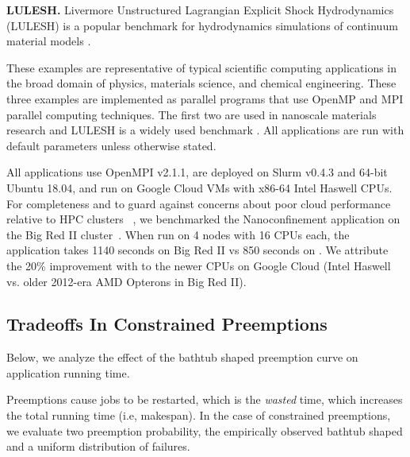 \noindent \textbf{LULESH.} Livermore Unstructured Lagrangian Explicit Shock Hydrodynamics (LULESH)  is a popular benchmark for hydrodynamics simulations of continuum material models \cite{IPDPS13:LULESH,LULESH2:changes}. 

These examples are representative of typical scientific computing applications in the broad domain of physics, materials science, and chemical engineering. These three examples are implemented as parallel programs that use OpenMP and MPI parallel computing techniques. The first two are used in nanoscale materials research \cite{jso1,jso2,solis2013generating,jjzo1,jto1,jyto} and LULESH is a widely used benchmark \cite{IPDPS13:LULESH,LULESH2:changes}.
All applications are run with default parameters unless otherwise stated. 


All applications use OpenMPI v2.1.1, are deployed on Slurm v0.4.3 and 64-bit Ubuntu 18.04, and run on Google Cloud VMs with x86-64 Intel Haswell CPUs. 
For completeness and to guard against concerns about poor cloud performance relative to HPC clusters ~\cite{iosup_performance_2011, zhai_cloud_2011, marathe2013comparative, galante_analysis_2016, benedictis_cloud-aware_2014}, we benchmarked the Nanoconfinement application on the Big Red II cluster~\cite{bigred2}. 
When run on 4 nodes with 16 CPUs each, the application takes 1140 seconds on Big Red II vs 850 seconds on \sysname. 
We attribute the 20\% improvement with \sysname to the newer CPUs on Google Cloud (Intel Haswell vs. older 2012-era AMD Opterons in Big Red II).


\vspace*{\subsecspace}

\subsection{Tradeoffs In Constrained Preemptions}

Below, we analyze the effect of the bathtub shaped preemption curve on application running time. 


Preemptions cause jobs to be restarted, which is the \emph{wasted} time, which increases the total running time (i.e, makespan).
In the case of constrained preemptions, we evaluate two preemption probability, the empirically observed bathtub shaped and a uniform distribution of failures.



